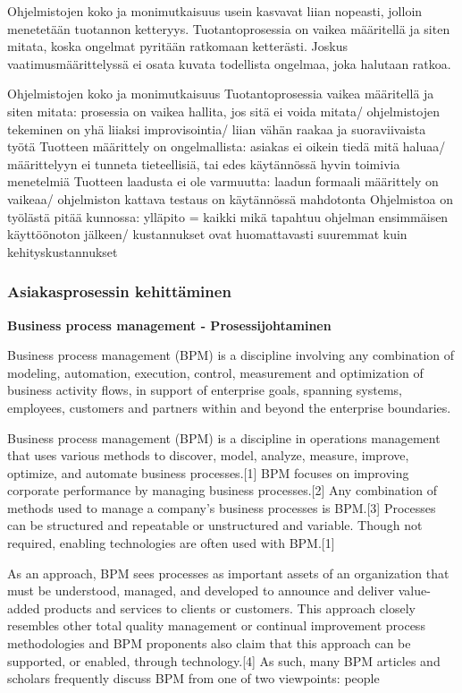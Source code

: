 \documentclass[finnish,12pt,a4paper,pdftex]{article}
\begin{document}
Ohjelmistojen koko ja monimutkaisuus usein kasvavat liian nopeasti, jolloin menetetään tuotannon ketteryys. Tuotantoprosessia on vaikea määritellä ja siten mitata, koska ongelmat pyritään ratkomaan ketterästi. Joskus vaatimusmäärittelyssä ei osata kuvata todellista ongelmaa, joka halutaan ratkoa. 

Ohjelmistojen koko ja monimutkaisuus
Tuotantoprosessia vaikea määritellä ja siten mitata: prosessia on vaikea hallita, jos sitä ei voida mitata/ ohjelmistojen tekeminen on yhä liiaksi improvisointia/ liian vähän raakaa ja suoraviivaista työtä
Tuotteen määrittely on ongelmallista: asiakas ei oikein tiedä mitä haluaa/ määrittelyyn ei tunneta tieteellisiä, tai edes käytännössä hyvin toimivia menetelmiä
Tuotteen laadusta ei ole varmuutta: laadun formaali määrittely on vaikeaa/ ohjelmiston kattava testaus on käytännössä mahdotonta
Ohjelmistoa on työlästä pitää kunnossa: ylläpito = kaikki mikä tapahtuu ohjelman ensimmäisen käyttöönoton jälkeen/ kustannukset ovat huomattavasti suuremmat kuin kehityskustannukset

\subsubsection{Asiakasprosessin kehittäminen}

\textbf{Business process management - Prosessijohtaminen}

Business process management (BPM) is a discipline involving any combination of modeling, automation, execution, control, measurement and optimization of business activity flows, in support of enterprise goals, spanning systems, employees, customers and partners within and beyond the enterprise boundaries.

Business process management (BPM) is a discipline in operations management that uses various methods to discover, model, analyze, measure, improve, optimize, and automate business processes.[1] BPM focuses on improving corporate performance by managing business processes.[2] Any combination of methods used to manage a company's business processes is BPM.[3] Processes can be structured and repeatable or unstructured and variable. Though not required, enabling technologies are often used with BPM.[1]

As an approach, BPM sees processes as important assets of an organization that must be understood, managed, and developed to announce and deliver value-added products and services to clients or customers. This approach closely resembles other total quality management or continual improvement process methodologies and BPM proponents also claim that this approach can be supported, or enabled, through technology.[4] As such, many BPM articles and scholars frequently discuss BPM from one of two viewpoints: people
\end{document}
